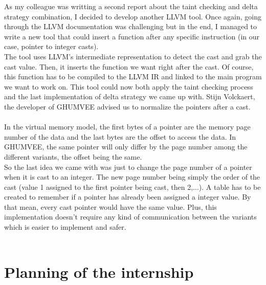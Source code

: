 \documentclass[english]{enstaPRE}
\begin{document}
As my colleague was writting a second report about the taint checking and delta strategy combination, I decided to develop another 
LLVM tool. Once again, going through the LLVM documentation was challenging but in the end, I managed to write a new tool that could
insert a function after any specific instruction (in our case, pointer to integer casts). \\ 
The tool uses LLVM's intermediate representation to detect the cast and grab the cast value. Then, it inserts the function we
want right after the cast. Of course, this function has to be compiled to the LLVM IR and linked to the main program we want to
work on.
This tool could now both apply the taint checking process and the last implementation of delta strategy we came up with.
Stijn Volckaert, the developer of GHUMVEE advised us to normalize the pointers after a cast. \\ \\
In the virtual memory model, the first bytes of a pointer are the memory page number of the data and the last bytes are the offset
to access the data. In GHUMVEE, the same pointer will only differ by the page number among the different variants, the offset 
being the same. \\ So the last idea we came with was just to change the page number of a pointer when it is cast to an integer.
The new page number being simply the order of the cast (value 1 assigned to the first pointer being cast, then 2,...).
A table has to be created to remember if a pointer has already been assigned a integer value.
By that mean, every cast pointer would have the same value. Plus, this implementation doesn't require any kind of communication between
the variants which is easier to implement and safer.\\
 \\

\chapter{Planning of the internship}
\end{document}
